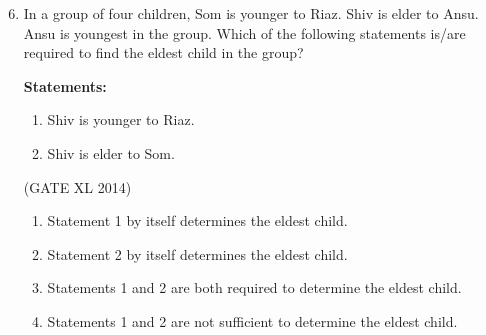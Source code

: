 \documentclass[journal,12pt,onecolumn]{IEEEtran}
\theoremstyle{remark}
\begin{document}
\begin{enumerate}
\setcounter{enumi}{5} 
    \item In a group of four children, Som is younger to Riaz. Shiv is elder to Ansu. Ansu is youngest in the group. Which of the following statements is/are required to find the eldest child in the group?
    \par
    \textbf{Statements:}
    \begin{enumerate}[label=\arabic*.]
        \item Shiv is younger to Riaz.
        \item Shiv is elder to Som.
    \end{enumerate}
    \hfill (GATE XL 2014)\\
    \begin{multicols}{2}
        \begin{enumerate}
            \item Statement 1 by itself determines the eldest child.
            \item Statement 2 by itself determines the eldest child.
            \item Statements 1 and 2 are both required to determine the eldest child.
            \item Statements 1 and 2 are not sufficient to determine the eldest child.
        \end{enumerate}
    \end{multicols}


\end{enumerate}
\end{document}
